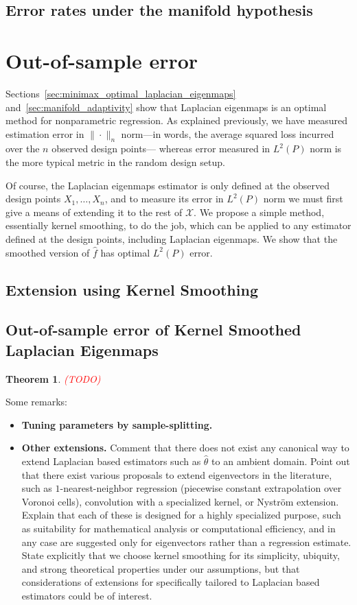 \documentclass{article}
\newcommand{\1}{\mathbf{1}}
\newcommand{\Xset}{\mathcal{X}}
\newcommand{\wh}[1]{\widehat{#1}}
\theoremstyle{alden}
\theoremstyle{aldenthm}
\newtheorem{theorem}{Theorem}
\theoremstyle{definition}
\theoremstyle{remark}
\begin{document}
\subsection{Error rates under the manifold hypothesis}

\section{Out-of-sample error}
\label{sec:out_of_sample}
Sections~\ref{sec:minimax_optimal_laplacian_eigenmaps} and~\ref{sec:manifold_adaptivity} show that Laplacian eigenmaps is an optimal method for nonparametric regression. As explained previously, we have measured estimation error in $\|\cdot\|_n$ norm---in words, the average squared loss incurred over the $n$ observed design points--- whereas error measured in $L^2(P)$ norm is the more typical metric in the random design setup.

Of course, the Laplacian eigenmaps estimator is only defined at the observed design points $X_1,\ldots,X_n$, and to measure its error in $L^2(P)$ norm we must first give a means of extending it to the rest of $\Xset$. We propose a simple method, essentially kernel smoothing, to do the job, which can be applied to any estimator defined at the design points, including Laplacian eigenmaps. We show that the smoothed version of $\wh{f}$ has optimal $L^2(P)$ error. 

\subsection{Extension using Kernel Smoothing}

\subsection{Out-of-sample error of Kernel Smoothed Laplacian Eigenmaps}

\begin{theorem}
	\label{thm:kernel_smoothing}
	\textcolor{red}{(TODO)}
\end{theorem}

Some remarks:
\begin{itemize}
	\item \textbf{Tuning parameters by sample-splitting.}
	\item \textbf{Other extensions.} Comment that there does not exist any canonical way to extend Laplacian based estimators such as $\wh{\theta}$ to an ambient domain. Point out that there exist various proposals to extend eigenvectors in the literature, such as $1$-nearest-neighbor regression (piecewise constant extrapolation over Voronoi cells), convolution with a specialized kernel, or Nystr\"{o}m extension. Explain that each of these is designed for a highly specialized purpose, such as suitability for mathematical analysis or computational efficiency, and in any case are suggested only for eigenvectors rather than a regression estimate. State explicitly that we choose kernel smoothing for its simplicity, ubiquity, and strong theoretical properties under our assumptions, but that considerations of extensions for specifically tailored to Laplacian based estimators could be of interest.
\end{itemize}
\end{document}
